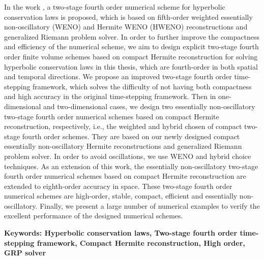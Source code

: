 In the work \cite{du2018hermite},
a two-stage fourth order numerical scheme for hyperbolic conservation laws is proposed,
which is based on fifth-order weighted essentially non-oscillatory (WENO) and Hermite WENO (HWENO) reconstructions and generalized Riemann problem solver.
In order to further improve the compactness and efficiency of the numerical scheme,
we aim to design explicit two-stage fourth order finite volume schemes based on compact Hermite reconstruction for solving hyperbolic conservation laws in this thesis,
which are fourth-order in both spatial and temporal directions.
We propose an improved two-stage fourth order time-stepping framework,
which solves the difficulty of not having both compactness and high accuracy in the original time-stepping framework.
Then in one-dimensional and two-dimensional cases,
we design two essentially non-oscillatory two-stage fourth order numerical schemes based on compact Hermite reconstruction,
respectively,
i.e.,
the weighted and hybrid chosen of compact two-stage fourth order schemes.
They are based on our newly designed compact essentially non-oscillatory Hermite reconstructions and generalized Riemann problem solver.
In order to avoid oscillations,
we use WENO and hybrid choice techniques.
As an extension of this work,
the essentially non-oscillatory two-stage fourth order numerical schemes based on compact Hermite reconstruction are extended to eighth-order accuracy in space.
These two-stage fourth order numerical schemes are high-order,
stable,
compact,
efficient and essentially non-oscillatory.
Finally,
we present a large number of numerical examples to verify the excellent performance of the designed numerical schemes.

\vspace{\baselineskip}\hangindent=62pt\noindent
{\textbf{\xiaosi Keywords: Hyperbolic conservation laws,
    Two-stage fourth order time-stepping framework,
    Compact Hermite reconstruction,
    High order,
    GRP solver}}